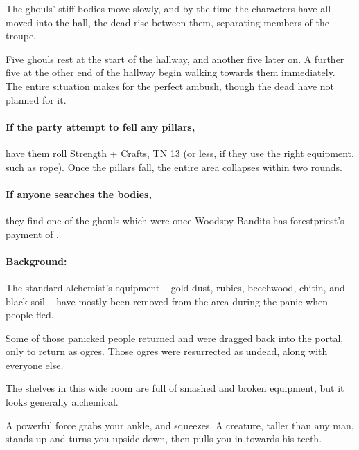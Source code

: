 \begin{multicols}{2}
The ghouls' stiff bodies move slowly, and by the time the characters have all moved into the hall, the dead rise between them, separating members of the troupe.

Five ghouls rest at the start of the hallway, and another five later on.
A further five at the other end of the hallway begin walking towards them immediately.
The entire situation makes for the perfect ambush, though the dead have not planned for it.


\paragraph{If the party attempt to fell any pillars,}
have them roll Strength + Crafts, TN 13 (or less, if they use the right equipment, such as rope).
Once the pillars fall, the entire area collapses within two rounds.

\paragraph{If anyone searches the bodies,}
they find one of the ghouls which were once Woodspy Bandits has \gls{forestpriest}'s payment of \lootMedium.



\paragraph{Background:}

The standard alchemist's equipment -- gold dust, rubies, beechwood, chitin, and black soil -- have mostly been removed from the area during the panic when people fled.

Some of those panicked people returned and were dragged back into the portal, only to return as ogres.
Those ogres were resurrected as undead, along with everyone else.

\begin{boxtext}

  The shelves in this wide room are full of smashed and broken equipment, but it looks generally alchemical.

\end{boxtext}

\begin{boxtext}

  A powerful force grabs your ankle, and squeezes.
  A creature, taller than any man, stands up and turns you upside down, then pulls you in towards his teeth.


\end{boxtext}
\end{multicols}
